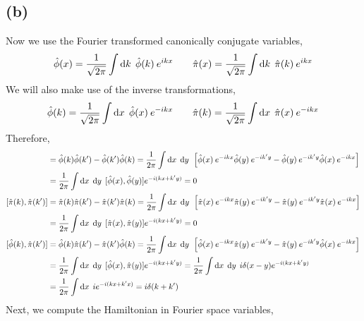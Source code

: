\documentclass[12pt]{extarticle}
\begin{document}
\subsection*{(b)}

Now we use the Fourier transformed canonically conjugate variables,
\[ \hat{\phi}(x) = \frac{1}{\sqrt{2\pi}} \int \mathrm{d}k \: \: \hat{\phi}(k) \: e^{i k x} \quad \quad \hat{\pi}(x) = \frac{1}{\sqrt{2\pi}} \int \mathrm{d}k \: \: \hat{\pi}(k) \: e^{i k x}\]
We will also make use of the inverse transformations,
\[ \hat{\phi}(k) = \frac{1}{\sqrt{2\pi}} \int \mathrm{d}x \: \: \hat{\phi}(x) \: e^{-i k x} \quad \quad \hat{\pi}(k) = \frac{1}{\sqrt{2\pi}} \int \mathrm{d}x \: \: \hat{\pi}(x) \: e^{-i k x}\]
Therefore,
\begin{align*}
[\hat{\phi}(k), \hat{\phi}(k')] & = \hat{\phi}(k) \hat{\phi}(k') - \hat{\phi}(k') \hat{\phi}(k) = \frac{1}{2 \pi}  \int \d{x} \: \d{y} \: \left[ \hat{\phi}(x) \: e^{-i k x} \hat{\phi}(y) \: e^{-i k' y} - \hat{\phi}(y) \: e^{-i k' y} \hat{\phi}(x) \: e^{-i k x} \right] \\ 
& = \frac{1}{2 \pi}  \int \d{x} \: \d{y} \: [\hat{\phi}(x), \hat{\phi}(y)] e^{-i(kx + k'y)} = 0 \\
[\hat{\pi}(k), \hat{\pi}(k')] & = \hat{\pi}(k) \hat{\pi}(k') - \hat{\pi}(k') \hat{\pi}(k) = \frac{1}{2 \pi}  \int \d{x} \: \d{y} \: \left[ \hat{\pi}(x) \: e^{-i k x} \hat{\pi}(y) \: e^{-i k' y} - \hat{\pi}(y) \: e^{-i k' y} \hat{\pi}(x) \: e^{-i k x} \right] \\ 
& = \frac{1}{2 \pi}  \int \d{x} \: \d{y} \: [\hat{\pi}(x), \hat{\pi}(y)] e^{-i(kx + k'y)} = 0 \\
[\hat{\phi}(k), \hat{\pi}(k')] & = \hat{\phi}(k) \hat{\pi}(k') - \hat{\pi}(k') \hat{\phi}(k) = \frac{1}{2 \pi}  \int \d{x} \: \d{y} \: \left[ \hat{\phi}(x) \: e^{-i k x} \hat{\pi}(y) \: e^{-i k' y} - \hat{\pi}(y) \: e^{-i k' y} \hat{\phi}(x) \: e^{-i k x} \right] \\ 
& = \frac{1}{2 \pi}  \int \d{x} \: \d{y} \: [\hat{\phi}(x), \hat{\pi}(y)] e^{-i(kx + k'y)} = \frac{1}{2 \pi}  \int \d{x} \: \d{y} \: i \delta(x - y) e^{-i(kx + k'y)} \\
& = \frac{1}{2 \pi}  \int \d{x} \: i  e^{-i(kx + k'x)} = i \delta(k + k')  \\
\end{align*}
Next, we compute the Hamiltonian in Fourier space variables,
\end{document}
